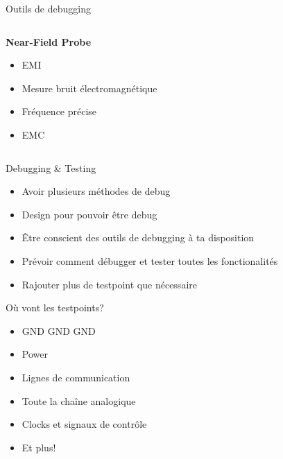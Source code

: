 \begin{frame}[t]{Outils de debugging}
\begin{columns}[T]
        \begin{column}{0.33\textwidth}
            \vspace{-12pt}
            \begin{center}
                \textbf{Near-Field Probe}
            \end{center}
            \begin{itemize}
                \item EMI
                \bigskip
                \item Mesure bruit électromagnétique
                \item Fréquence précise
                \item EMC
            \end{itemize}
        \end{column}
    \end{columns}
    \vspace{-0.25\textwidth}
    \begin{columns}
        \begin{column}{0.33\textwidth}
        \end{column}
        \begin{column}{0.33\textwidth}
        \end{column}
        \begin{column}{0.33\textwidth}
        \end{column}
    \end{columns}
\end{frame}

\begin{frame}{Debugging \& Testing}
    \begin{itemize}
        \item Avoir plusieurs méthodes de debug
        \item Design pour pouvoir être debug
        \item Être conscient des outils de debugging à ta disposition
        \item Prévoir comment débugger et tester toutes les fonctionalités
        \bigskip
        \item Rajouter plus de testpoint que nécessaire
    \end{itemize}
\end{frame}

\begin{frame}{Où vont les testpoints?}
    \begin{itemize}
        \item GND GND GND
        \item Power
        \item Lignes de communication
        \item Toute la chaîne analogique
        \item Clocks et signaux de contrôle
        \item Et plus!
    \end{itemize}
\end{frame}


